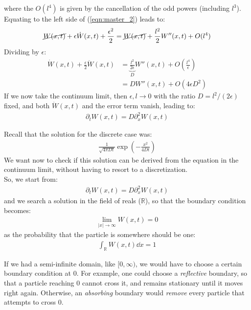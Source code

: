 \documentclass[../template.tex]{subfiles}
\begin{document}
where the $O(l^4)$ is given by the cancellation of the odd powers (including $l^3$). Equating to the left side of (\ref{eqn:master_2}) leads to:  
\begin{align*}
    \cancel{W(x,t)}+ \epsilon \dot{W}(x,t) + \frac{\epsilon^2}{2} = \cancel{W(x,t)} + \frac{l^2}{2} W''(x,t) + O(l^4)  
\end{align*}
Dividing by $\epsilon$:
\begin{align*}
    \dot{W}(x,t) + \frac{\epsilon}{2} \ddot{W}(x,t) &= \underbrace{\frac{l^2}{2 \epsilon}}_{D}  W''(x,t) + O\left(\frac{l^4}{\epsilon} \right)  \\
    &= D W''(x,t) + O(4 \epsilon D^2)
\end{align*} 
If we now take the continuum limit, then $\epsilon, l \to 0$ with the ratio $D = l^2/(2\epsilon)$ fixed, and both $\ddot{W}(x,t)$ and the error term vanish, leading to:
\begin{align*}
    \partial_t W(x,t) = D \partial_x^2 W(x,t)
\end{align*}  

Recall that the solution for the discrete case was:
\begin{align*}
    \frac{1}{\sqrt{4 \pi D t}} \exp\left(-\frac{x^2}{4 D t} \right) 
\end{align*}
We want now to check if this solution can be derived from the equation in the continuum limit, without having to resort to a discretization.\\
So, we start from:
\begin{align*}
    \partial_t W(x,t) = D \partial_x^2 W(x,t)
\end{align*}
and we search a solution in the field of reals ($\mathbb{R}$), so that the boundary condition becomes:
\begin{align*}
    \lim_{|x| \to \infty} W(x,t) = 0
\end{align*}
as the probability that the particle is somewhere should be one:
\begin{align*}
    \int_{\mathbb{R}} W(x,t) \dd{x} = 1
\end{align*}

If we had a semi-infinite domain, like $[0, \infty)$, we would have to choose a certain boundary condition at $0$. For example, one could choose a \textit{reflective} boundary, so that a particle reaching $0$ cannot cross it, and remains stationary until it moves right again. Otherwise, an \textit{absorbing} boundary would \textit{remove} every particle that attempts to cross $0$.\\
\end{document}

